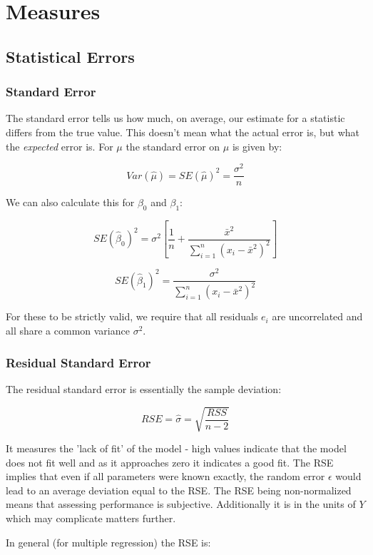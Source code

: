 \section{Measures}

\subsection{Statistical Errors}

\subsubsection{Standard Error}

The standard error tells us how much, on average, our estimate for a statistic differs from the true value. This doesn't mean what the actual error is, but what the \textit{expected} error is. For $\mu$ the standard error on $\hat{\mu}$ is given by:

$$ Var(\hat{\mu}) = SE(\hat{\mu})^{2} = \frac{\sigma^{2}}{n} $$

We can also calculate this for $\beta_{0}$ and $\beta_{1}$:

$$ SE(\hat{\beta}_{0})^{2} = \sigma^{2} \left[ \frac{1}{n} + \frac{\bar{x}^{2}}{\sum^{n}_{i=1}(x_{i} - \bar{x}^{2})^{2}} \right] $$

$$ SE(\hat{\beta}_{1})^{2} = \frac{\sigma^{2}}{\sum^{n}_{i=1}(x_{i} - \bar{x}^{2})^{2}} $$

For these to be strictly valid, we require that all residuals $e_{i}$ are uncorrelated and all share a common variance $\sigma^{2}$.

\subsubsection{Residual Standard Error}

The residual standard error is essentially the sample deviation:

$$ RSE = \hat{\sigma} = \sqrt{\frac{RSS}{n-2}} $$

It measures the 'lack of fit' of the model - high values indicate that the model does not fit well and as it approaches zero it indicates a good fit. The RSE implies that even if all parameters were known exactly, the random error $\epsilon$ would lead to an average deviation equal to the RSE. The RSE being non-normalized means that assessing performance is subjective. Additionally it is in the units of $Y$ which may complicate matters further.

In general (for multiple regression) the RSE is:

